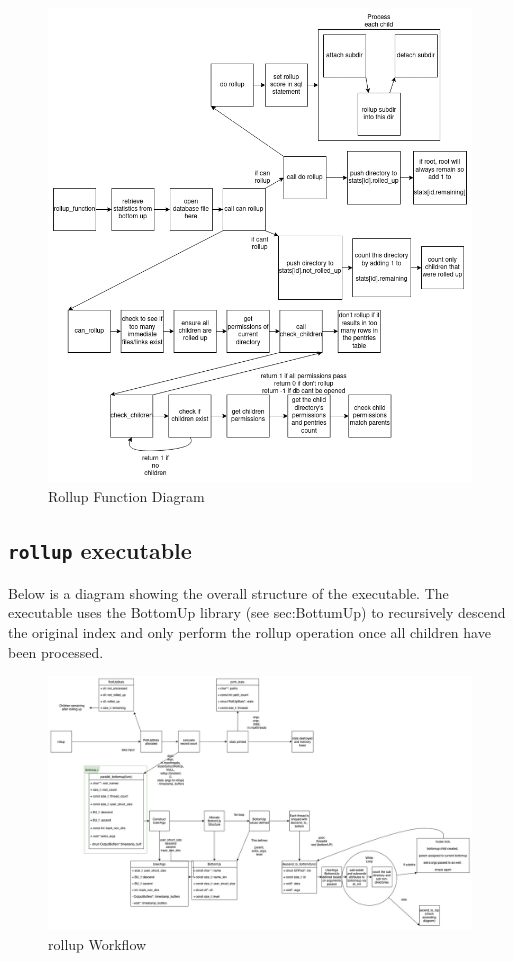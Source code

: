 \begin{figure} [h]
\centering
\includegraphics[height=0.45\textheight]{images/rollup_function.png}
\caption{Rollup Function Diagram}
\end{figure}

\subsection{\texttt{rollup} executable}
Below is a diagram showing the overall structure of the \rollup
executable. The \rollup executable uses the BottomUp library
(see sec:BottumUp) to recursively descend the original index and
only perform the rollup operation once all children have been
processed.

\begin{figure} [h]
\centering
\includegraphics[width=1.2\textwidth]{images/rollup.png}
\caption{rollup Workflow}
\end{figure}
